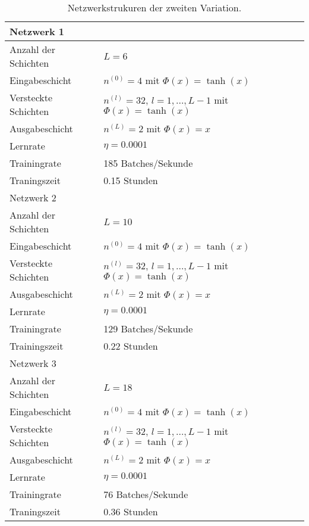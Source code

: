\begin{table}
       \renewcommand{\arraystretch}{1.0}
       \centering
       \begin{tabular}{ l | l }
              \hline
              Netzwerk 1 & \\
              \hline
              Anzahl der Schichten & $L=6$ \\
              Eingabeschicht & $n^{(0)}=4$ mit $\Phi(x)=\tanh(x)$ \\
              Versteckte Schichten & $n^{(l)}=32$, $l = 1, \dots, L-1$ mit $\Phi(x)=\tanh(x)$ \\
              Ausgabeschicht & $n^{(L)}=2$ mit $\Phi(x)=x$ \\
              Lernrate & $\eta=0.0001$ \\
              Trainingrate & 185 Batches/Sekunde \\
              Traningszeit & 0.15 Stunden \\
              \hline
              Netzwerk 2 & \\
              \hline
              Anzahl der Schichten & $L=10$ \\
              Eingabeschicht & $n^{(0)}=4$ mit $\Phi(x)=\tanh(x)$ \\
              Versteckte Schichten & $n^{(l)}=32$, $l = 1, \dots, L-1$ mit $\Phi(x)=\tanh(x)$ \\
              Ausgabeschicht & $n^{(L)}=2$ mit $\Phi(x)=x$ \\
              Lernrate & $\eta=0.0001$ \\
              Trainingrate & 129 Batches/Sekunde \\
              Trainingszeit & 0.22 Stunden \\
              \hline
              Netzwerk 3 & \\
              \hline
              Anzahl der Schichten & $L=18$ \\
              Eingabeschicht & $n^{(0)}=4$ mit $\Phi(x)=\tanh(x)$ \\
              Versteckte Schichten & $n^{(l)}=32$, $l = 1, \dots, L-1$ mit $\Phi(x)=\tanh(x)$ \\
              Ausgabeschicht & $n^{(L)}=2$ mit $\Phi(x)=x$ \\
              Lernrate & $\eta=0.0001$ \\
              Trainingrate & 76 Batches/Sekunde \\
              Traningszeit & 0.36 Stunden \\
              \hline
       \end{tabular}
       \caption{Netzwerkstrukuren der zweiten Variation.}
       \label{stiff-table-second}
\end{table}
